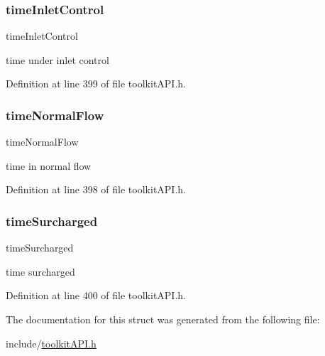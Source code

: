 \subsubsection{\texorpdfstring{timeInletControl}{timeInletControl}}
{\footnotesize\ttfamily time\+Inlet\+Control}

time under inlet control 

Definition at line 399 of file toolkit\+A\+P\+I.\+h.

\mbox{\label{struct_s_m___link_stats_a280dc840607ae09223dc876b8c56dd3a}} 
\subsubsection{\texorpdfstring{timeNormalFlow}{timeNormalFlow}}
{\footnotesize\ttfamily time\+Normal\+Flow}

time in normal flow 

Definition at line 398 of file toolkit\+A\+P\+I.\+h.

\mbox{\label{struct_s_m___link_stats_ae5c6e5a148cd0c7920e6298adccd4648}} 
\subsubsection{\texorpdfstring{timeSurcharged}{timeSurcharged}}
{\footnotesize\ttfamily time\+Surcharged}

time surcharged 

Definition at line 400 of file toolkit\+A\+P\+I.\+h.



The documentation for this struct was generated from the following file\+:\begin{DoxyCompactItemize}
\item 
include/\mbox{\hyperlink{toolkit_a_p_i_8h}{toolkit\+A\+P\+I.\+h}}\end{DoxyCompactItemize}
